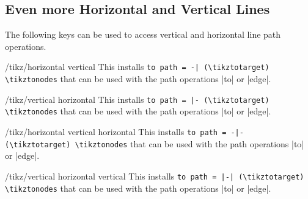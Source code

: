 \subsection{Even more Horizontal and Vertical Lines}

The following keys can be used to access vertical and horizontal line path operations.
\begin{stylekey}{/tikz/horizontal vertical}
  This installs  \verb!to path = -| (\tikztotarget) \tikztonodes! that can be used with
  the path operations |to| or |edge|.
\end{stylekey}
\begin{stylekey}{/tikz/vertical horizontal}
  This installs \verb!to path = |- (\tikztotarget) \tikztonodes! that can be used with
  the path operations |to| or |edge|.
\end{stylekey}
\begin{stylekey}{/tikz/horizontal vertical horizontal}
  This installs  \verb!to path = -|- (\tikztotarget) \tikztonodes! that can be used with
  the path operations |to| or |edge|.
\end{stylekey}
\begin{stylekey}{/tikz/vertical horizontal vertical}
  This installs  \verb!to path = |-| (\tikztotarget) \tikztonodes! that can be used with
  the path operations |to| or |edge|.
\end{stylekey}

